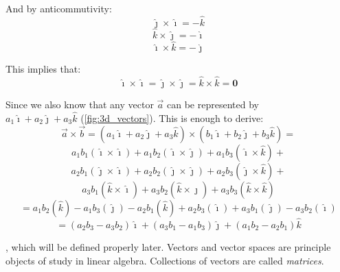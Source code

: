 \documentclass{tufte-book}
\begin{document}
And by anticommutivity:
\begin{equation*}
	\hat{\jmath} \times \hat{\imath} = -\hat{k}
\end{equation*}
\begin{equation*}
	\hat{k} \times \hat{\jmath} = -\hat{\imath}
\end{equation*}
\begin{equation*}
	\hat{\imath} \times \hat{k} = -\hat{\jmath}
\end{equation*}

This implies that:
\begin{equation*}
	\hat{\imath} \times \hat{\imath} = \hat{\jmath} \times \hat{\jmath} = \hat{k} \times \hat{k} = \textbf{0}
\end{equation*}

Since we also know that any vector $\vec{a}$ can be represented by \\
$a_1\hat{\imath}+a_2\hat{\jmath}+a_3\hat{k}$
(\cref{fig:3d_vectors}). This is enough to derive:
\begin{equation*}
	\vec{a} \times \vec{b} = (a_1\hat{\imath}+a_2\hat{\jmath}+a_3\hat{k}) \times (b_1\hat{\imath}+b_2\hat{\jmath}+b_3\hat{k}) =
\end{equation*}
\begin{equation*}
	a_1b_1(\hat{\imath}\times\hat{\imath})+a_1b_2(\hat{\imath}\times\hat{\jmath})+a_1b_3(\hat{\imath}\times\hat{k}) +
\end{equation*}
\begin{equation*}
	a_2b_1(\hat{\jmath}\times\hat{\imath})+a_2b_2(\hat{\jmath}\times\hat{\jmath})+a_2b_3(\hat{\jmath}\times\hat{k}) +
\end{equation*}
\begin{equation*}
	a_3b_1(\hat{k}\times\hat{\imath})+a_3b_2(\hat{k}\times\hat{\jmath})+a_3b_3(\hat{k}\times\hat{k})
\end{equation*}
\begin{equation*}
	= a_1b_2(\hat{k}) - a_1b_3(\hat{\jmath}) - a_2b_1(\hat{k}) + a_2b_3(\hat{\imath}) + a_3b_1(\hat{\jmath}) - a_3b_2(\hat{\imath})
\end{equation*}
\begin{equation*}
	=(a_2b_3-a_3b_2)\hat{\imath} + (a_3b_1-a_1b_3)\hat{\jmath} + (a_1b_2-a_2b_1)\hat{k}
\end{equation*}

,
which will be defined properly later.
Vectors and vector spaces are principle objects of study in linear algebra. Collections of vectors are called
\emph{matrices}.
\end{document}
